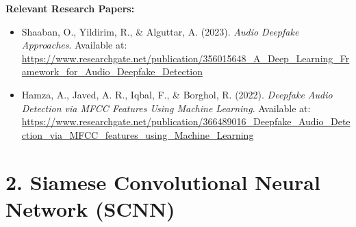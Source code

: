 \documentclass{article}
\begin{document}
\noindent
\textbf{Relevant Research Papers:}
\begin{itemize}
    \item Shaaban, O., Yildirim, R., \& Alguttar, A. (2023). \textit{Audio Deepfake Approaches}. Available at: \url{https://www.researchgate.net/publication/356015648_A_Deep_Learning_Framework_for_Audio_Deepfake_Detection}
    \item Hamza, A., Javed, A. R., Iqbal, F., \& Borghol, R. (2022). \textit{Deepfake Audio Detection via MFCC Features Using Machine Learning}. Available at: \url{https://www.researchgate.net/publication/366489016_Deepfake_Audio_Detection_via_MFCC_features_using_Machine_Learning}
\end{itemize}

\section*{2. Siamese Convolutional Neural Network (SCNN)}
\end{document}
